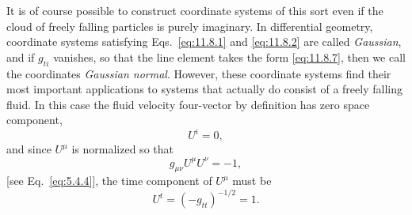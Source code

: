It is of course possible to construct coordinate systems of this sort even
if the cloud of freely falling particles is purely imaginary. In differential
geometry, coordinate systems satisfying Eqs.~\eqref{eq:11.8.1} and
\eqref{eq:11.8.2} are called \emph{Gaussian}, and if \(g_{ti}\) vanishes, so
that the line element takes the form \eqref{eq:11.8.7}, then we call the
coordinates \emph{Gaussian normal}. However, these coordinate systems find
their most important applications to systems that actually do consist of a
freely falling fluid. In this case the fluid velocity four-vector by
definition has zero space component,
\begin{equation}
  U^i=0,
  \tag{11.8.9}\label{eq:11.8.9}
\end{equation}
and since \(U^\mu\) is normalized so that
\begin{equation}
  g_{\mu\nu}U^\mu U^\nu=-1,
  \tag{11.8.10}\label{eq:11.8.10}
\end{equation}
[see Eq.~\eqref{eq:5.4.4}], the time component of \(U^\mu\) must be
\begin{equation}
  U^t=(-g_{tt})^{-1/2}=1.
  \tag{11.8.11}\label{eq:11.8.11}
\end{equation}

